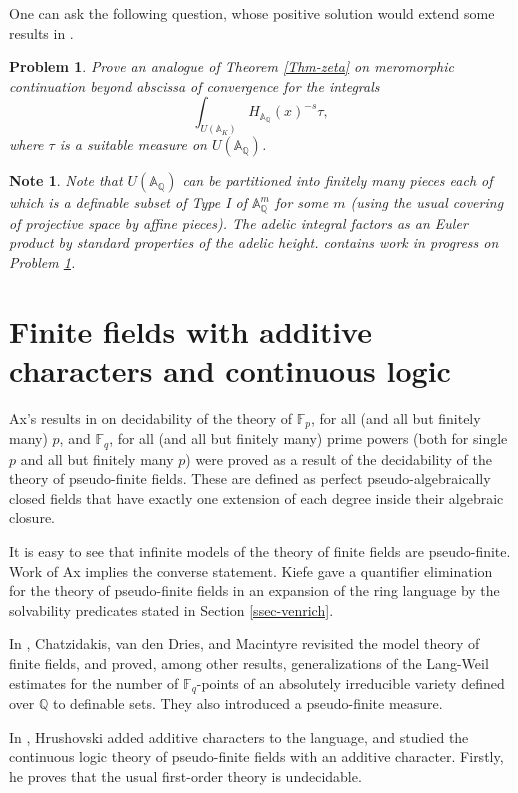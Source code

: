 \documentclass[12pt]{amsart}
\def\A{\mathbb{A}}
\def\F{\mathbb{F}}
\def\Q{\mathbb{Q}}
\def\F{\mathbb{F}}
\numberwithin{equation}{section}
\newtheorem{prob}{Problem}[section]
\newtheorem{note}{Note}[section]
\begin{document}
One can ask the following question, whose positive solution would extend some results 
in \cite{GO}.

\begin{prob}\label{height} Prove an analogue of Theorem \ref{Thm-zeta} on meromorphic continuation beyond abscissa of convergence for the integrals
$$\int_{U(\A_K)} H_{\A_{\Q}}(x)^{-s} \tau,$$
where $\tau$ is a suitable measure on $U(\A_{\Q})$.
\end{prob}
\begin{note} Note that $U(\A_{\Q})$ can be partitioned into finitely many pieces each of which is a definable subset of Type I of 
$\A_{\Q}^m$ for some $m$ (using the usual covering of projective space by affine pieces). The adelic integral factors as an Euler product by standard properties of the 
adelic height. \cite{zeta2} contains work in progress on Problem \ref{height}. 
\end{note}


\section{\bf Finite fields with additive characters and continuous logic}\label{fin-char}

Ax's results in \cite{ax} on decidability of the theory of $\F_p$, for all (and all but finitely many) $p$, and $\F_q$, for all (and all but finitely many) prime powers (both for single $p$ and all but finitely many $p$) were proved as a result of the 
decidability of the theory of pseudo-finite fields. These are defined as perfect pseudo-algebraically closed fields that have exactly one extension of each degree inside their algebraic closure. 

It is easy to see that infinite models of the theory of finite fields are 
pseudo-finite. Work of Ax \cite{ax} implies the converse statement. Kiefe \cite{Kiefe} gave a quantifier elimination for the theory of pseudo-finite fields in an expansion of the ring language by the solvability predicates stated in Section \ref{ssec-venrich}.

In \cite{CDM}, Chatzidakis, van den Dries, and Macintyre revisited the model theory of finite fields, and proved, among other results, generalizations of the 
Lang-Weil estimates for the number of $\F_q$-points of an absolutely irreducible variety defined over $\Q$ to definable sets. They also introduced a pseudo-finite measure. 

In \cite{udi-char}, Hrushovski added additive characters to the language, and studied the continuous logic theory of 
pseudo-finite fields with an additive character. Firstly, he proves that the usual first-order theory is undecidable.
\end{document}
